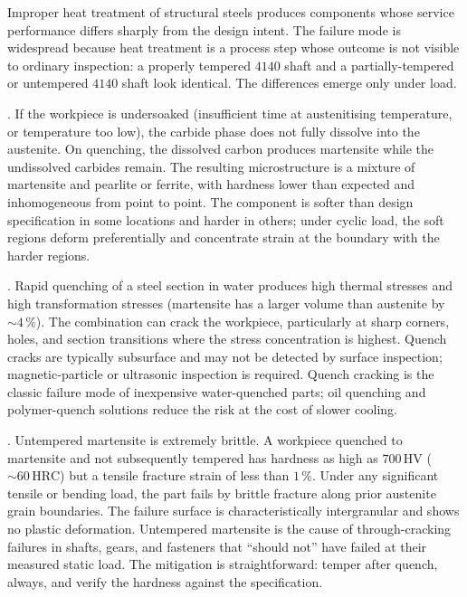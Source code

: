 Improper heat treatment of structural steels produces components
whose service performance differs sharply from the design intent.
The failure mode is widespread because heat treatment is a process
step whose outcome is not visible to ordinary inspection: a properly
tempered $4140$ shaft and a partially-tempered or untempered
$4140$ shaft look identical. The differences emerge only under load.

. If the workpiece is undersoaked
(insufficient time at austenitising temperature, or temperature too
low), the carbide phase does not fully dissolve into the austenite.
On quenching, the dissolved carbon produces martensite while the
undissolved carbides remain. The resulting microstructure is a
mixture of martensite and pearlite or ferrite, with hardness lower
than expected and inhomogeneous from point to point. The component
is softer than design specification in some locations and harder in
others; under cyclic load, the soft regions deform preferentially
and concentrate strain at the boundary with the harder regions.

. Rapid quenching of a steel section in
water produces high thermal stresses and high transformation
stresses (martensite has a larger volume than austenite by $\sim 4\,
\%$). The combination can crack the workpiece, particularly at
sharp corners, holes, and section transitions where the stress
concentration is highest. Quench cracks are typically subsurface
and may not be detected by surface inspection; magnetic-particle or
ultrasonic inspection is required. Quench cracking is the classic
failure mode of inexpensive water-quenched parts; oil quenching and
polymer-quench solutions reduce the risk at the cost of slower
cooling.

. Untempered
martensite is extremely brittle. A workpiece quenched to martensite
and not subsequently tempered has hardness as high as $700\,\text{HV}$
($\sim 60\,\text{HRC}$) but a tensile fracture strain of less than
$1\,\%$. Under any significant tensile or bending load, the part
fails by brittle fracture along prior austenite grain boundaries.
The failure surface is characteristically intergranular and shows
no plastic deformation. Untempered martensite is the cause of
through-cracking failures in shafts, gears, and fasteners that
``should not'' have failed at their measured static load. The
mitigation is straightforward: temper after quench, always, and
verify the hardness against the specification.

